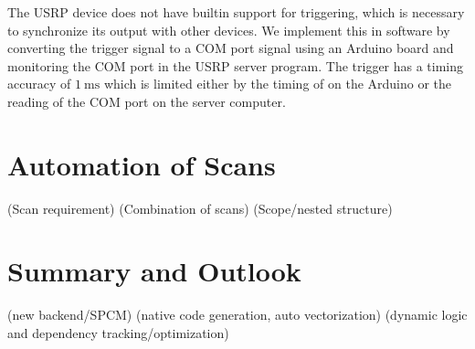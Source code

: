 The USRP device does not have builtin support for triggering,
which is necessary to synchronize its output with other devices.
We implement this in software by converting the trigger signal to a COM port signal
using an Arduino board and monitoring the COM port in the USRP server program.
The trigger has a timing accuracy of $1~\mathrm{ms}$
which is limited either by the timing of on the Arduino or
the reading of the COM port on the server computer.

\section{Automation of Scans}
\label{ch:computer-control:scan}

(Scan requirement)
(Combination of scans)
(Scope/nested structure)

\section{Summary and Outlook}
\label{ch:computer-control:summary}
(new backend/SPCM)
(native code generation, auto vectorization)
(dynamic logic and dependency tracking/optimization)
